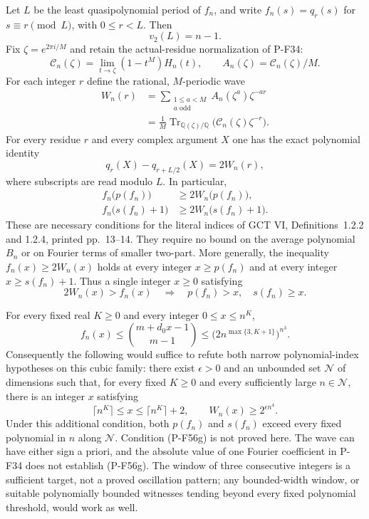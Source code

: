 \begin{proposition}
Let $L$ be the least quasipolynomial period of $f_n$, and write
$f_n(s)=q_r(s)$ for $s\equiv r\pmod L$, with
$0\le r<L$. Then
\[
                     v_2(L)=n-1.                            \tag{P-F56b}
\]
Fix $\zeta=e^{2\pi i/M}$ and retain the actual-residue
normalization of P-F34:
\[
 \mathcal C_n(\zeta)=\lim_{t\to\zeta}(1-t^M)H_n(t),
 \qquad A_n(\zeta)=\mathcal C_n(\zeta)/M.
\]
For each integer $r$ define the rational, $M$-periodic wave
\[
 \begin{split}
 W_n(r)
   &=\sum_{\substack{1\le a<M\\a\text{ odd}}}
                      A_n(\zeta^a)\zeta^{-ar}\\
   &=\frac1M\operatorname{Tr}_{\mathbb Q(\zeta)/\mathbb Q}
                  \bigl(\mathcal C_n(\zeta)\zeta^{-r}\bigr).
 \end{split}                                                 \tag{P-F56c}
\]
For every residue $r$ and every complex argument $X$ one has
the exact polynomial identity
\[
               q_r(X)-q_{r+L/2}(X)=2W_n(r),                 \tag{P-F56d}
\]
where subscripts are read modulo $L$. In particular,
\[
 \begin{split}
 f_n\bigl(p(f_n)\bigr)&\ge2W_n\bigl(p(f_n)\bigr),\\
 f_n\bigl(s(f_n)+1\bigr)&\ge2W_n\bigl(s(f_n)+1\bigr).
 \end{split}                                                 \tag{P-F56e}
\]
These are necessary conditions for the literal indices of
GCT VI, Definitions~1.2.2 and 1.2.4, printed pp.~13--14.
They require no bound on the average polynomial $B_n$ or on
Fourier terms of smaller two-part.
More generally, the inequality $f_n(x)\ge2W_n(x)$ holds
at every integer $x\ge p(f_n)$ and at every integer
$x\ge s(f_n)+1$. Thus a single integer $x\ge0$ satisfying
\[
          2W_n(x)>f_n(x)
       \quad\Longrightarrow\quad p(f_n)>x,
                                  \quad s(f_n)\ge x.
 \tag{P-F56e'}
\]

For every fixed real $K\ge0$ and every integer $0\le x\le n^K$,
\[
 f_n(x)\le\binom{m+d_0x-1}{m-1}
     \le\bigl(2n^{\max\{3,K+1\}}\bigr)^{n^3}.
 \tag{P-F56f}
\]
Consequently the following would suffice to refute both narrow
polynomial-index hypotheses on this cubic family: there exist
$\epsilon>0$ and an unbounded set $\mathcal N$ of dimensions
such that, for every fixed $K\ge0$ and every sufficiently large
$n\in\mathcal N$, there is an integer $x$ satisfying
\[
 \lceil n^K\rceil\le x\le\lceil n^K\rceil+2,
                         \qquad W_n(x)\ge2^{\epsilon n^4}.
 \tag{P-F56g}
\]
Under this additional condition, both $p(f_n)$ and $s(f_n)$
exceed every fixed polynomial in $n$ along $\mathcal N$.
Condition (P-F56g) is not proved here. The wave can have
either sign a priori, and the absolute value of one Fourier
coefficient in P-F34 does not establish (P-F56g).
The window of three consecutive integers is a sufficient
target, not a proved oscillation pattern; any bounded-width
window, or suitable polynomially bounded witnesses tending
beyond every fixed polynomial threshold, would work as well.
\end{proposition}

